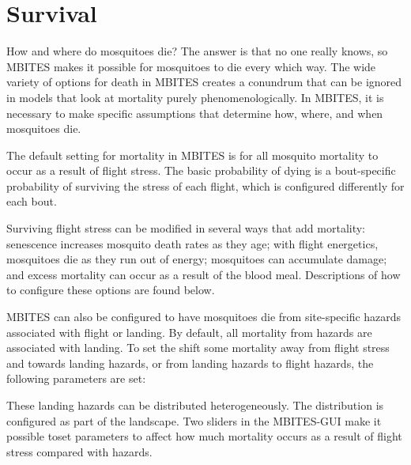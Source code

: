 \documentclass{article}
\newcommand{\ie}{{\em i.e., }}
\begin{document}
\clearpage 


\section{Survival}

How and where do mosquitoes die? The answer is that no one really knows, so MBITES makes it possible for mosquitoes to die every which way. The wide variety of options for death in MBITES creates a conundrum that can be ignored in models that look at mortality purely phenomenologically. In MBITES, it is necessary to make specific assumptions that determine how, where, and when mosquitoes die. 

The default setting for mortality in MBITES is for all mosquito mortality to occur as a result of flight stress. The basic probability of dying is a bout-specific probability of surviving the stress of each flight, which is configured differently for each bout. 
%
%
Surviving flight stress can be modified in several ways that add mortality: senescence increases mosquito death rates as they age; with flight energetics, mosquitoes die as they run out of energy; mosquitoes can accumulate damage; and excess mortality can occur as a result of the blood meal. Descriptions of how to configure these options are found below.

MBITES can also be configured to have mosquitoes die from site-specific hazards associated with flight or landing. By default, all mortality from hazards are associated with landing. To set the shift some mortality away from flight stress and towards landing hazards, or from landing hazards to flight hazards, the following parameters are set:  
%
%
These landing hazards can be distributed heterogeneously. The distribution is configured as part of the landscape. Two sliders in the MBITES-GUI make it possible toset parameters to affect how much mortality occurs as a result of flight stress compared with hazards. 
\end{document}
